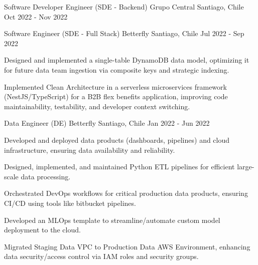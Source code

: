 \cventry
{Software Developer Engineer (SDE - Backend)}
{Grupo Central}
{Santiago, Chile}
{Oct 2022 - Nov 2022}
{}

\cventry
{Software Engineer (SDE - Full Stack)}
{Betterfly}
{Santiago, Chile}
{Jul 2022 - Sep 2022}
{
\begin{cvitems}
    \item Designed and implemented a single-table DynamoDB data model, optimizing it for future data team ingestion via composite keys and strategic indexing.
    \item Implemented Clean Architecture in a serverless microservices framework (NestJS/TypeScript) for a B2B flex benefits application, improving code maintainability, testability, and developer context switching.
\end{cvitems}
}

\cventry
{Data Engineer (DE)}
{Betterfly}
{Santiago, Chile}
{Jan 2022 - Jun 2022}
{
\begin{cvitems}
    \item Developed and deployed data products (dashboards, pipelines) and cloud infrastructure, ensuring data availability and reliability.
    \item Designed, implemented, and maintained Python ETL pipelines for efficient large-scale data processing.
    \item Orchestrated DevOps workflows for critical production data products, ensuring CI/CD using tools like bitbucket pipelines.
    \item Developed an MLOps template to streamline/automate custom model deployment to the cloud.
    \item Migrated Staging Data VPC to Production Data AWS Environment, enhancing data security/access control via IAM roles and security groups.
\end{cvitems}
}
